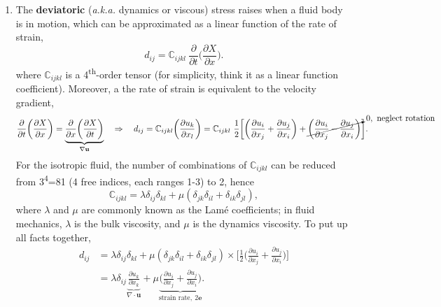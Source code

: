 \documentclass[a4paper]{article}
\begin{document}
\begin{enumerate}
    \item The \textbf{deviatoric} (\textit{a.k.a.} dynamics or viscous) stress raises when a fluid body is in motion, which can be approximated as a linear function of the rate of strain,
    \[
        d_{ij} = \mathbb{C}_{ijkl} \ \frac{\partial}{\partial t} \bigg( \frac{\partial X}{\partial x} \bigg).
    \]
    where $\mathbb{C}_{ijkl}$ is a 4\textsuperscript{th}-order tensor (for simplicity, think it as a linear function coefficient). Moreover, a the rate of strain is equivalent to the velocity gradient,
    \[
        \frac{\partial}{\partial t} \bigg( \frac{\partial X}{\partial x} \bigg) = \underbrace{\frac{\partial}{\partial x} \bigg( \frac{\partial X}{\partial t} \bigg)}_{\nabla \mathbf{u}} \quad \Rightarrow \quad d_{ij} = \mathbb{C}_{ijkl} \bigg( \frac{\partial u_{k}}{\partial x_{l}} \bigg) = \mathbb{C}_{ijkl} \ \frac{1}{2} \bigg[ \bigg(\frac{\partial u_{i}}{\partial x_{j}} + \frac{\partial u_{j}}{\partial x_{i}}\bigg) + \cancelto{0,\ \text{neglect rotation}}{\bigg(\frac{\partial u_{i}}{\partial x_{j}} - \frac{\partial u_{j}}{\partial x_{i}}\bigg)} \bigg].
    \]
    For the isotropic fluid, the number of combinations of  $\mathbb{C}_{ijkl}$ can be reduced from 3\textsuperscript{4}=81 (4 free indices, each ranges 1-3) to 2, hence
    \[
        \mathbb{C}_{ijkl} = \lambda \delta_{ij} \delta_{kl} + \mu (\delta_{jk} \delta_{il} + \delta_{ik} \delta_{jl} ),
    \]
    where $\lambda$ and $\mu$ are commonly known as the Lam\'e coefficients; in fluid mechanics, $\lambda$ is the bulk viscosity, and $\mu$ is the dynamics viscosity. To put up all facts together,
    \begin{align*}
        d_{ij}
        & = \lambda \delta_{ij} \delta_{kl} + \mu (\delta_{jk} \delta_{il} + \delta_{ik} \delta_{jl} ) \times \bigg[ \frac{1}{2} \bigg(\frac{\partial u_{i}}{\partial x_{j}} + \frac{\partial u_{j}}{\partial x_{i}}\bigg) \bigg] \\
        & = \lambda \delta_{ij} \underbrace{\frac{\partial u_{k}}{\partial x_{k}}}_{\nabla \cdot \mathbf{u}} + \mu \underbrace{\bigg(\frac{\partial u_{i}}{\partial x_{j}} + \frac{\partial u_{j}}{\partial x_{i}}\bigg)}_{\text{strain rate}, \ 2\mathbf{e}}.
    \end{align*}
\end{enumerate}
\end{document}
